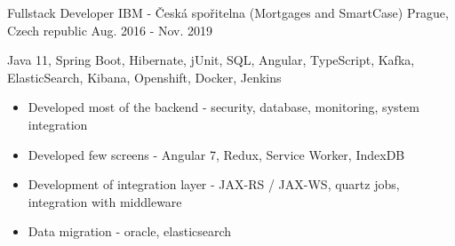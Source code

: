 \begin{cventries}
    \cventry
    {Fullstack Developer} %
    {IBM - Česká spořitelna (Mortgages and SmartCase)} %
    {Prague,  Czech republic} %
    {Aug. 2016 - Nov. 2019} %
    {
        \hspace{15pt} \faHammer Java 11, Spring Boot, Hibernate, jUnit, SQL, Angular, TypeScript, Kafka, ElasticSearch, Kibana, Openshift, Docker, Jenkins
        \begin{itemize}
            \item {Developed most of the backend - security, database, monitoring, system integration}
            \item {Developed few screens - Angular 7, Redux, Service Worker, IndexDB}
            \item {Development of integration layer - JAX-RS / JAX-WS, quartz jobs, integration with middleware}
            \item {Data migration - oracle, elasticsearch}
        \end{itemize}
    }
\end{cventries}

